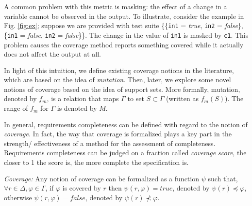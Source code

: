 
%
%

A common problem with this metric is masking:
the effect of a change in a variable cannot be observed in the output. To illustrate, consider the example in Fig. \ref{fig:ex}; suppose we are provided with
test suite \{\{{\tt in1} = \emph{true}, {\tt in2} = \emph{false}\},
\{{\tt in1} = \emph{false}, {\tt in2} = \emph{false}\}\}. The change in the value of
{\tt in1} is masked by {\tt c1}. This problem causes the coverage method reports something covered
while it actually does not affect the output at all.





\iffalse
In light of this intuition, we define existing coverage notions in the literature, which are based on the idea of \emph{mutation}. Then, later, we explore some novel notions of coverage based on the idea of support sets.  More formally, mutation, denoted by $f_m$, is a relation that maps $\Gamma$ to set $S \subset \Gamma$ (written as $f_m (S)$). The range of $f_m$ for $\Gamma$ is denoted by $M$.

In general, requirements completeness can be defined with regard to the notion of \emph{coverage}. In fact, the way that coverage is formalized plays a key part in the strength/ effectiveness of a method for the assessment of completeness. Requirements completeness can be judged on a fraction called \emph{coverage score}, the closer to 1 the score is, the more complete the specification is.

\begin{definition}{\emph{Coverage:}}
  \label{def:coverage}
   Any notion of coverage can be formalized as a function $\psi$ such that,
   $\forall r \in \Delta, \varphi \in \Gamma$, if $\varphi$ is covered by $r$ then $\psi (r, \varphi) = true$, denoted by $\psi (r) \preccurlyeq \varphi$, otherwise  $\psi (r, \varphi) = false$, denoted by $\psi (r) \nprec \varphi$.
\end{definition}

